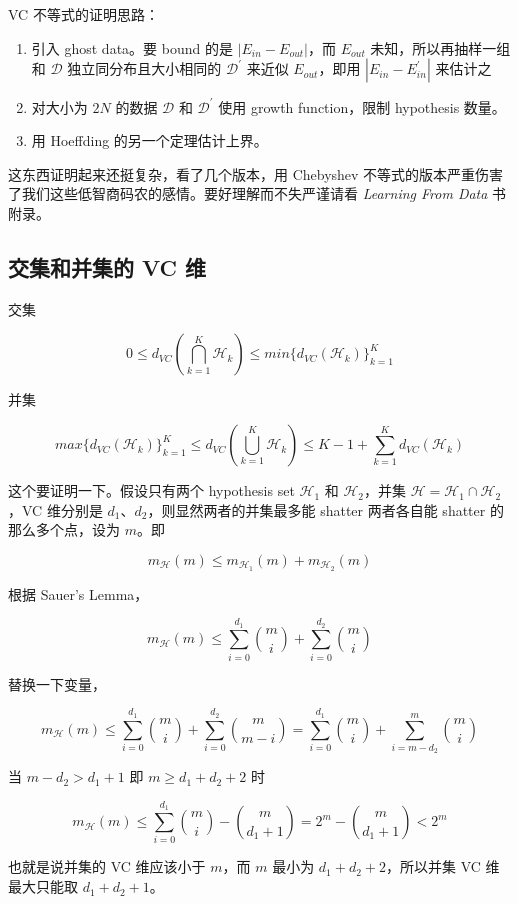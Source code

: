\documentclass[a4paper]{article}
\begin{document}
VC 不等式的证明思路：
\begin{enumerate}
  \item 引入 ghost data。要 bound 的是 $|E_{in} - E_{out}|$，而 $E_{out}$ 未知，所以再抽样一组和 $\mathcal{D}$ 独立同分布且大小相同的 $\mathcal{D}^{\prime}$ 来近似 $E_{out}$，即用 $|E_{in} - E_{in}^{\prime}|$ 来估计之
  \item 对大小为 $2N$ 的数据 $\mathcal{D}$ 和 $\mathcal{D}^{\prime}$ 使用 growth function，限制 hypothesis 数量。
  \item 用 Hoeffding 的另一个定理估计上界。
\end{enumerate}

这东西证明起来还挺复杂，看了几个版本，用 Chebyshev 不等式的版本严重伤害了我们这些低智商码农的感情。要好理解而不失严谨请看 \textit{Learning From Data} 书附录。


\subsection{交集和并集的 VC 维}
交集

$$0 \le d_{VC}(\bigcap_{k=1}^{K}\mathcal{H}_k) \le min\{d_{VC}(\mathcal{H}_k)\}_{k=1}^K$$

并集

$$max\{d_{VC}(\mathcal{H}_k)\}_{k=1}^{K} \le d_{VC}(\bigcup_{k=1}^{K}\mathcal{H}_k) \le K - 1 + \sum_{k=1}^{K}d_{VC}(\mathcal{H}_k)$$

这个要证明一下。假设只有两个 hypothesis set $\mathcal{H}_1$ 和 $\mathcal{H}_2$，并集 $\mathcal{H} = \mathcal{H}_1 \cap \mathcal{H}_2$，VC 维分别是 $d_1$、$d_2$，则显然两者的并集最多能 shatter 两者各自能 shatter 的那么多个点，设为 $m$。即

$$m_{\mathcal{H}}(m) \le m_{\mathcal{H}_1}(m) + m_{\mathcal{H}_2}(m)$$

根据 Sauer's Lemma，

$$m_{\mathcal{H}}(m) \le \sum_{i=0}^{d_1}\binom{m}{i} + \sum_{i=0}^{d_2}\binom{m}{i}$$

替换一下变量，

$$m_{\mathcal{H}}(m) \le \sum_{i=0}^{d_1}\binom{m}{i} + \sum_{i=0}^{d_2}\binom{m}{m-i} = \sum_{i=0}^{d_1}\binom{m}{i} + \sum_{i=m-d_2}^{m}\binom{m}{i}$$

当 $m - d_2 > d_1 + 1$ 即 $m \ge d_1 + d_2 + 2$ 时

$$m_{\mathcal{H}}(m) \le \sum_{i=0}^{d_1}\binom{m}{i} - \binom{m}{d_1+1} = 2^m - \binom{m}{d_1+1} < 2^m$$

也就是说并集的 VC 维应该小于 $m$，而 $m$ 最小为 $d_1 + d_2 + 2$，所以并集 VC 维最大只能取 $d_1 + d_2 + 1$。
\end{document}
